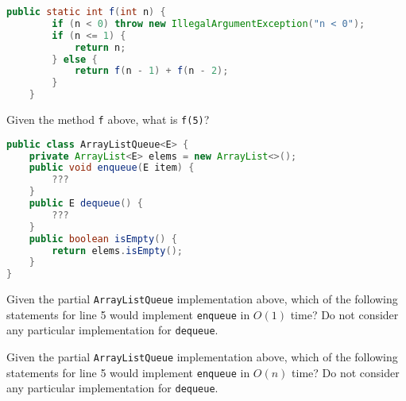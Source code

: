 \documentclass[addpoints,9pt]{exam}
\begin{document}
\begin{questions}


\vspace{.1in}

\begin{lstlisting}[language=Java]
    public static int f(int n) {
        if (n < 0) throw new IllegalArgumentException("n < 0");
        if (n <= 1) {
            return n;
        } else {
            return f(n - 1) + f(n - 2);
        }
    }
\end{lstlisting}

\question[3] Given the method {\tt f} above, what is {\tt f(5)}?

\begin{choices}
\end{choices}



\vspace{.2in}

\begin{lstlisting}[language=Java]
public class ArrayListQueue<E> {
    private ArrayList<E> elems = new ArrayList<>();
    public void enqueue(E item) {
        ???
    }
    public E dequeue() {
        ???
    }
    public boolean isEmpty() {
        return elems.isEmpty();
    }
}
\end{lstlisting}

\question[3] Given the partial {\tt ArrayListQueue} implementation above, which of the following statements for line 5 would implement {\tt enqueue} in $O(1)$ time?  Do not consider any particular implementation for {\tt dequeue}.

\begin{choices}
\end{choices}

\question[3] Given the partial {\tt ArrayListQueue} implementation above, which of the following statements for line 5 would implement {\tt enqueue} in $O(n)$ time? Do not consider any particular implementation for {\tt dequeue}.


\end{questions}
\end{document}
